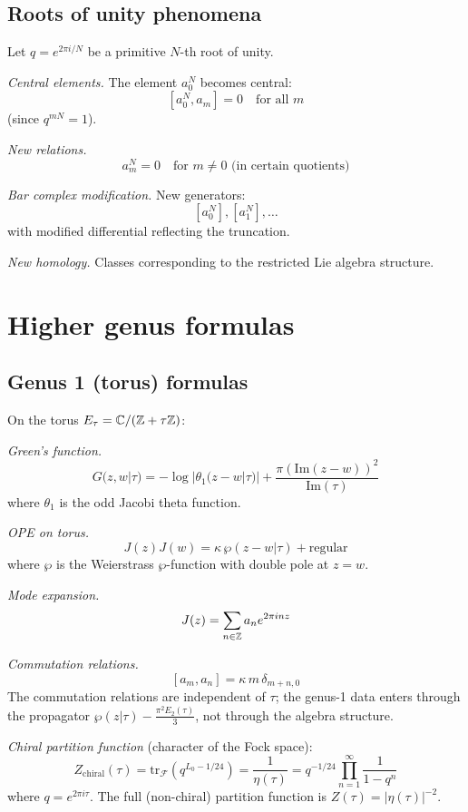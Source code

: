 \subsection{Roots of unity phenomena}

\begin{computation}\label{comp:q-root-unity}
Let $q = e^{2\pi i/N}$ be a primitive $N$-th root of unity.

\emph{Central elements.} The element $a_0^N$ becomes central:
\[
[a_0^N, a_m] = 0 \quad \text{for all } m
\]
(since $q^{mN} = 1$).

\emph{New relations.}
\[
a_m^N = 0 \quad \text{for } m \neq 0 \text{ (in certain quotients)}
\]

\emph{Bar complex modification.} New generators:
\[
[a_0^N], [a_1^N], \ldots
\]
with modified differential reflecting the truncation.

\emph{New homology.} Classes corresponding to the restricted Lie algebra structure.
\end{computation}


\section{Higher genus formulas}
\label{sec:higher-genus-details}

\subsection{Genus 1 (torus) formulas}

\begin{computation}\label{comp:heisenberg-torus}
On the torus $E_\tau = \mathbb{C}/(\mathbb{Z} + \tau\mathbb{Z})$:

\emph{Green's function.}
\[
G(z, w | \tau) = -\log|\theta_1(z-w|\tau)| + \frac{\pi(\mathrm{Im}(z-w))^2}{\mathrm{Im}(\tau)}
\]
where $\theta_1$ is the odd Jacobi theta function.

\emph{OPE on torus.}
\[
J(z) J(w) = \kappa\,\wp(z-w|\tau) + \text{regular}
\]
where $\wp$ is the Weierstrass $\wp$-function with double pole at $z = w$.

\emph{Mode expansion.}
\[
J(z) = \sum_{n \in \mathbb{Z}} a_n e^{2\pi i n z}
\]

\emph{Commutation relations.}
\[
[a_m, a_n] = \kappa\, m\,\delta_{m+n,0}
\]
The commutation relations are independent of $\tau$; the genus-1 data enters through the propagator $\wp(z|\tau) - \frac{\pi^2 E_2(\tau)}{3}$, not through the algebra structure.

\emph{Chiral partition function} (character of the Fock space):
\[
Z_{\mathrm{chiral}}(\tau) = \mathrm{tr}_{\mathcal{F}}(q^{L_0 - 1/24}) = \frac{1}{\eta(\tau)} = q^{-1/24} \prod_{n=1}^\infty \frac{1}{1 - q^n}
\]
where $q = e^{2\pi i \tau}$.  The full (non-chiral) partition function is $Z(\tau) = |\eta(\tau)|^{-2}$.
\end{computation}


